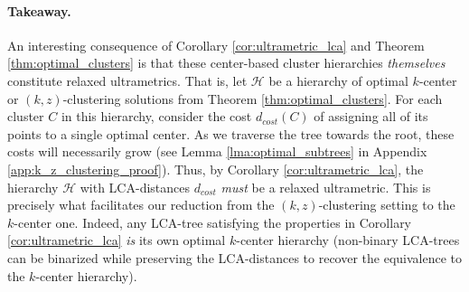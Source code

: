 \paragraph{Takeaway.} An interesting consequence of Corollary \ref{cor:ultrametric_lca} and Theorem \ref{thm:optimal_clusters} is that these center-based cluster hierarchies \emph{themselves} constitute relaxed ultrametrics. That is, let $\mathcal{H}$ be a hierarchy of optimal $k$-center or $(k, z)$-clustering solutions from Theorem \ref{thm:optimal_clusters}. For each cluster $C$ in this hierarchy, consider the cost $d_{cost}(C)$ of assigning all of its points to a single optimal center. As we traverse the tree towards the root, these costs will necessarily grow (see Lemma \ref{lma:optimal_subtrees} in Appendix \ref{app:k_z_clustering_proof}). Thus, by Corollary \ref{cor:ultrametric_lca}, the hierarchy $\mathcal{H}$ with LCA-distances $d_{cost}$ \emph{must} be a relaxed ultrametric. This is precisely what facilitates our reduction from the $(k, z)$-clustering setting to the $k$-center one. Indeed, any LCA-tree satisfying the properties in Corollary \ref{cor:ultrametric_lca} \emph{is} its own optimal $k$-center hierarchy (non-binary LCA-trees can be binarized while preserving the LCA-distances to recover the equivalence to the $k$-center hierarchy).
